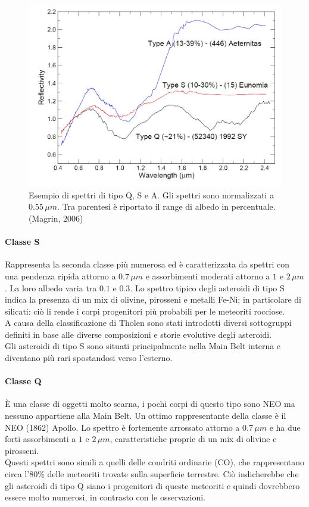 \documentclass[a4paper,11pt,openright]{book}
\begin{document}
\begin{figure}
\centering
\includegraphics[scale=0.3]{figure/spettro_qsa.jpg}
\caption{Esempio di spettri di tipo Q, S e A. Gli spettri sono normalizzati a $0.55\,\mu m$. Tra parentesi è riportato il range di albedo in percentuale. (Magrin, 2006)}
\label{spettro_qsa}
\end{figure}

\paragraph*{Classe S}
Rappresenta la seconda classe più numerosa ed è caratterizzata da spettri con una pendenza ripida attorno a $0.7\,\mu m$ e assorbimenti moderati attorno a $1$ e $2\,\mu m$. La loro albedo varia tra $0.1$ e $0.3$. Lo spettro tipico degli asteroidi di tipo S indica la presenza di un mix di olivine, pirosseni e metalli Fe-Ni; in particolare di silicati: ciò li rende i corpi progenitori più probabili per le meteoriti rocciose.\\
A causa della classificazione di Tholen sono stati introdotti diversi sottogruppi definiti in base alle diverse composizioni e storie evolutive degli asteroidi.\\
Gli asteroidi di tipo S sono situati principalmente nella Main Belt interna e diventano più rari spostandosi verso l'esterno.

\paragraph*{Classe Q}
È una classe di oggetti molto scarna, i pochi corpi di questo tipo sono NEO ma nessuno appartiene alla Main Belt. Un ottimo rappresentante della classe è il NEO (1862) Apollo. Lo spettro è fortemente arrossato attorno a $0.7\,\mu m$ e ha due forti assorbimenti a $1$ e $2\,\mu m$, caratteristiche proprie di un mix di olivine e pirosseni.\\
Questi spettri sono simili a quelli delle condriti ordinarie (CO), che rappresentano circa l'80\% delle meteoriti trovate sulla superficie terrestre. Ciò indicherebbe che gli asteroidi di tipo Q siano i progenitori di queste meteoriti e quindi dovrebbero essere molto numerosi, in contrasto con le osservazioni.
\end{document}
